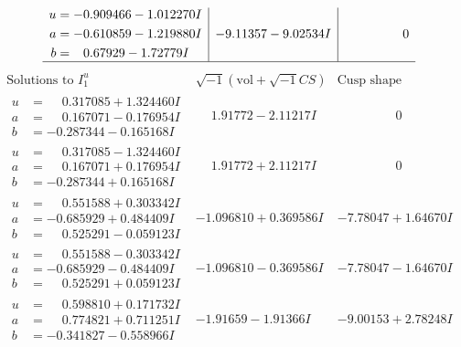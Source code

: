 \documentclass[1p]{elsarticle_modified}
\theoremstyle{definition}
\newcommand{\I}{\sqrt{-1}}
\begin{document}
$$\begin{array}{c|c|c}
\begin{aligned}
u &= -0.909466 - 1.012270 I \\
a &= -0.610859 - 1.219880 I \\
b &= \phantom{-}0.67929 - 1.72779 I\end{aligned}
 & -9.11357 - 9.02534 I & \phantom{-0.000000 } 0\\
 \hline 
 \end{array}$$\newpage$$\begin{array}{c|c|c}  
\text{Solutions to }I^u_{1}& \I (\text{vol} + \sqrt{-1}CS) & \text{Cusp shape}\\
 \hline 
\begin{aligned}
u &= \phantom{-}0.317085 + 1.324460 I \\
a &= \phantom{-}0.167071 - 0.176954 I \\
b &= -0.287344 - 0.165168 I\end{aligned}
 & \phantom{-}1.91772 - 2.11217 I & \phantom{-0.000000 } 0 \\ \hline\begin{aligned}
u &= \phantom{-}0.317085 - 1.324460 I \\
a &= \phantom{-}0.167071 + 0.176954 I \\
b &= -0.287344 + 0.165168 I\end{aligned}
 & \phantom{-}1.91772 + 2.11217 I & \phantom{-0.000000 } 0 \\ \hline\begin{aligned}
u &= \phantom{-}0.551588 + 0.303342 I \\
a &= -0.685929 + 0.484409 I \\
b &= \phantom{-}0.525291 - 0.059123 I\end{aligned}
 & -1.096810 + 0.369586 I & -7.78047 + 1.64670 I \\ \hline\begin{aligned}
u &= \phantom{-}0.551588 - 0.303342 I \\
a &= -0.685929 - 0.484409 I \\
b &= \phantom{-}0.525291 + 0.059123 I\end{aligned}
 & -1.096810 - 0.369586 I & -7.78047 - 1.64670 I \\ \hline\begin{aligned}
u &= \phantom{-}0.598810 + 0.171732 I \\
a &= \phantom{-}0.774821 + 0.711251 I \\
b &= -0.341827 - 0.558966 I\end{aligned}
 & -1.91659 - 1.91366 I & -9.00153 + 2.78248 I \\ \hline\begin{aligned}

\end{aligned}
\end{array}$$
\end{document}
